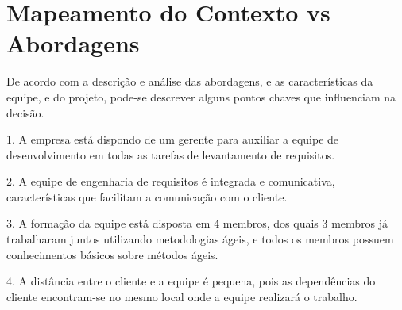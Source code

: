 \section {Mapeamento do Contexto vs Abordagens}

De acordo com a descrição e análise das abordagens, e as características da equipe, e do projeto, pode-se descrever alguns pontos chaves que influenciam na decisão.

1. A empresa está dispondo de um gerente para auxiliar a equipe de desenvolvimento em todas as tarefas de levantamento de requisitos.

2. A equipe de engenharia de requisitos é integrada e comunicativa, características que facilitam a comunicação com o cliente.

3. A formação da equipe está disposta em 4 membros, dos quais 3 membros já trabalharam juntos utilizando metodologias ágeis, e todos os membros possuem conhecimentos básicos sobre métodos ágeis.

4. A distância entre o cliente e a equipe é pequena, pois as dependências do cliente encontram-se no mesmo local onde a equipe realizará o trabalho.
